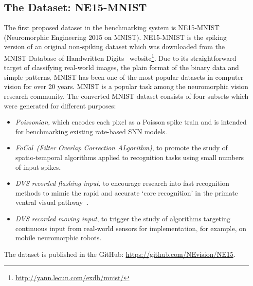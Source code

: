 \subsection{The Dataset: NE15-MNIST}
\label{sec:data}
The first proposed dataset in the benchmarking system is NE15-MNIST (Neuromorphic Engineering 2015 on MNIST).
NE15-MNIST is the spiking version of an original non-spiking dataset which was downloaded from the MNIST Database of Handwritten Digits~\citep{lecun1998gradient}  website\footnote{\url{http://yann.lecun.com/exdb/mnist/}}.
Due to its straightforward target of classifying real-world images, the plain format of the binary data and simple patterns, MNIST has been one of the most popular datasets in computer vision for over 20 years.
MNIST is a popular task among the neuromorphic vision research community.
The converted MNIST dataset consists of four subsets which were generated for different purposes:
\begin{itemize}
	\item \textit{Poissonian},
	which encodes each pixel as a Poisson spike train and is intended for benchmarking existing rate-based SNN models.
	\item \textit{FoCal~(Filter Overlap Correction ALgorithm)},
	to promote the study of spatio-temporal algorithms applied to recognition tasks using small numbers of input spikes.
	\item \textit{DVS recorded flashing input},
	to encourage research into fast recognition methods to mimic the rapid and accurate `core recognition' in the primate ventral visual pathway~\citep{dicarlo2012does}.
	\item \textit{DVS recorded moving input},
	to trigger the study of algorithms targeting continuous input from real-world sensors for implementation, for example, on mobile neuromorphic robots.
\end{itemize}
The dataset is published in the GitHub: \url{https://github.com/NEvision/NE15}.
